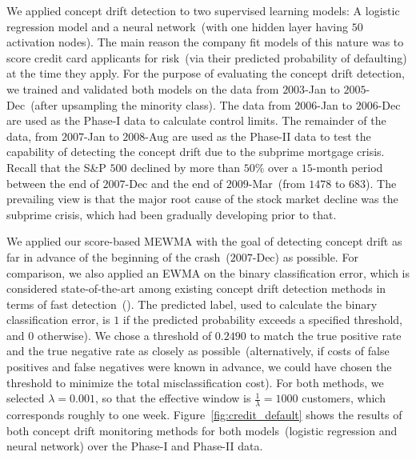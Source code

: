 \documentclass[twoside,11pt]{article}
\begin{document}
We applied concept drift detection to two supervised learning models:  A logistic regression model and a neural network~(with one hidden layer having $50$ activation nodes). The main reason the company fit models of this nature was to score credit card applicants for risk~(via their predicted probability of defaulting) at the time they apply. For the purpose of evaluating the concept drift detection, we trained and validated both models on the data from $2003$-Jan to $2005$-Dec~(after upsampling the minority class). The data from $2006$-Jan to $2006$-Dec are used as the Phase-I data to calculate control limits. The remainder of the data, from $2007$-Jan to $2008$-Aug are used as the Phase-II data to test the capability of detecting the concept drift due to the subprime mortgage crisis. Recall that the S\&P $500$ declined by more than $50\%$ over a $15$-month period between the end of $2007$-Dec and the end of $2009$-Mar~(from $1478$ to $683$). The prevailing view is that the major root cause of the stock market decline was the subprime crisis, which had been gradually developing prior to that.

We applied our score-based MEWMA with the goal of detecting concept drift as far in advance of the beginning of the crash~($2007$-Dec) as possible. For comparison, we also applied an EWMA on the binary classification error, which is considered state-of-the-art among existing concept drift detection methods in terms of fast detection~(\cite{barros2018large}). The predicted label, used to calculate the binary classification error, is $1$ if the predicted probability exceeds a specified threshold, and $0$ otherwise). We chose a threshold of $0.2490$ to match the true positive rate and the true negative rate as closely as possible~(alternatively, if costs of false positives and false negatives were known in advance, we could have chosen the threshold to minimize the total misclassification cost). For both methods, we selected $\lambda = 0.001$, so that the effective window is $\frac{1}{\lambda} = 1000$ customers, which corresponds roughly to one week. Figure~\ref{fig:credit_default} shows the results of both concept drift monitoring methods for both models~(logistic regression and neural network) over the Phase-I and Phase-II data. 
\end{document}
